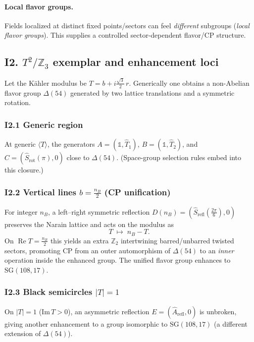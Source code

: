 \documentclass[11pt]{article}
\begin{document}
          \paragraph{Local flavor groups.}
              Fields localized at distinct fixed points/sectors can feel \emph{different} subgroups (\emph{local flavor groups}). This supplies a controlled sector-dependent flavor/CP structure.

  \subsection*{I2. $T^2/\mathbb Z_3$ exemplar and enhancement loci}

      Let the Kähler modulus be $T=b+i\tfrac{\sqrt3}{2}\,r$. Generically one obtains a non-Abelian flavor group $\Delta(54)$ generated by two lattice translations and a symmetric rotation.

      \subsubsection*{I2.1 Generic region}
          At generic $\langle T\rangle$, the generators $A=(\mathbb 1,\widehat T_1)$, $B=(\mathbb 1,\widehat T_2)$, and $C=(\widehat S_{\mathrm{rot}}(\pi),0)$ close to $\Delta(54)$. (Space-group selection rules embed into this closure.)

      \subsubsection*{I2.2 Vertical lines $b=\tfrac{n_B}{2}$ (CP unification)}
          For integer $n_B$, a left–right symmetric reflection $D(n_B)=(\widehat S_{\mathrm{refl}}(\tfrac{2\pi}{6}),0)$ preserves the Narain lattice and acts on the modulus as
          \[
              T\;\longmapsto\; n_B - T.
          \]
          On $\operatorname{Re}T=\tfrac{n_B}{2}$ this yields an extra $\mathbb Z_2$ intertwining barred/unbarred twisted sectors, promoting CP from an outer automorphism of $\Delta(54)$ to an \emph{inner} operation inside the enhanced group. The unified flavor group enhances to $\mathrm{SG}(108,17)$.

      \subsubsection*{I2.3 Black semicircles $|T|=1$}
          On $|T|=1$ ($\mathrm{Im}\,T>0$), an asymmetric reflection $E=(\widehat A_{\mathrm{refl}},0)$ is unbroken, giving another enhancement to a group isomorphic to $\mathrm{SG}(108,17)$ (a different extension of $\Delta(54)$).
\end{document}
